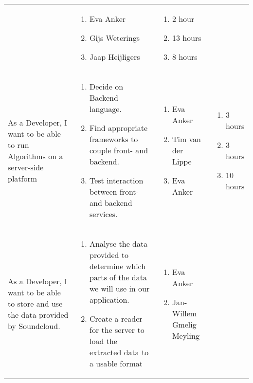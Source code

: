 \documentclass[11pt,a4paper]{article}
\begin{document}
\begin{table}[h]
\begin{tabular}{|p{4.5cm}|p{7cm}|p{4cm}|p{2.6cm}|}
& 
\begin{enumerate}
\item Eva Anker
\item Gijs Weterings
\item Jaap Heijligers
\end{enumerate}

& 
\begin{enumerate}
\item 2 hour
\item 13 hours
\item 8 hours
\end{enumerate} \\

As a Developer, I want to be able to run Algorithms on a server-side platform & \begin{enumerate}
\item Decide on Backend language.
\item Find appropriate frameworks to couple front- and backend.
\item Test interaction between front- and backend services.
\end{enumerate}

& 
\begin{enumerate}
\item Eva Anker
\item Tim van der Lippe
\item Eva Anker
\end{enumerate}

& 
\begin{enumerate}
\item 3 hours
\item 3 hours
\item 10 hours
\end{enumerate} \\

As a Developer, I want to be able to store and use the data provided by Soundcloud. & \begin{enumerate}
\item Analyse the data provided to determine which parts of the data we will use in our application.
\item Create a reader for the server to load the extracted data to a usable format
\end{enumerate}

& 
\begin{enumerate}
\item Eva Anker
\item Jan-Willem Gmelig Meyling
\end{enumerate}


\end{tabular}
\end{table}
\end{document}
